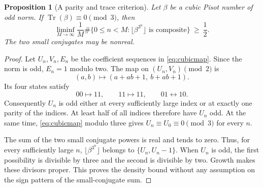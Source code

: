 \documentclass[11pt,a4paper]{article}
\newtheorem{proposition}[theorem]{Proposition}
\theoremstyle{remark}\newtheorem{remark}[theorem]{Remark}
\begin{document}
\begin{proposition}[A parity and trace criterion]
\label{local:prop:half}
Let $\beta$ be a cubic Pisot number of odd norm. If
$\operatorname{Tr}(\beta)\equiv0\pmod3$, then
\[
 \liminf_{M\to\infty}\frac{1}{M}
 \#\{0\le n<M:\lfloor\beta^{3^n}\rfloor
                  \text{ is composite}\}\ \ge\ \frac12.
\]
The two small conjugates may be nonreal.
\end{proposition}
\begin{proof}
Let $U_n,V_n,E_n$ be the coefficient sequences in
\eqref{eq:cubicmap}. Since the norm is odd, $E_n=1$ modulo two.
The map on $(U_n,V_n)\pmod2$ is
\[
 (a,b)\longmapsto(a+ab+1,\ b+ab+1).
\]
Its four states satisfy
\[
 00\longmapsto11,\qquad11\longmapsto11,
 \qquad01\longleftrightarrow10.
\]
Consequently $U_n$ is odd either at every sufficiently large index
or at exactly one parity of the indices. At least half of all
indices therefore have $U_n$ odd. At the same time,
\eqref{eq:cubicmap} modulo three gives $U_n\equiv U_0\equiv0\pmod3$
for every $n$.

The sum of the two small conjugate powers is real and tends to zero.
Thus, for every sufficiently large $n$,
$\lfloor\beta^{3^n}\rfloor$ belongs to $\{U_n,U_n-1\}$.
When $U_n$ is odd, the first possibility is divisible by three and
the second is divisible by two. Growth makes these divisors proper.
This proves the density bound without any assumption on the sign
pattern of the small-conjugate sum.
\end{proof}
\end{document}
